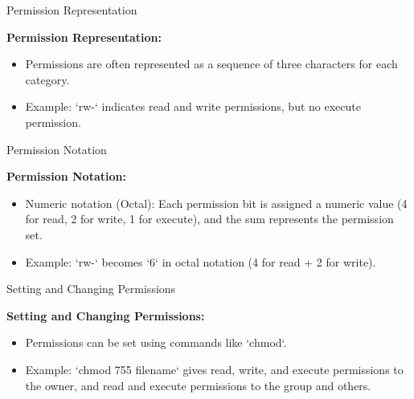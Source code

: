 \documentclass{beamer}
\begin{document}
\begin{frame}{Permission Representation}

  \textbf{Permission Representation:}

  \begin{itemize}
    \item Permissions are often represented as a sequence of three characters for each category.
    \item Example: `rw-` indicates read and write permissions, but no execute permission.
  \end{itemize}

\end{frame}

\begin{frame}{Permission Notation}

  \textbf{Permission Notation:}

  \begin{itemize}
    \item Numeric notation (Octal): Each permission bit is assigned a numeric value (4 for read, 2 for write, 1 for execute), and the sum represents the permission set.
    \item Example: `rw-` becomes `6` in octal notation (4 for read + 2 for write).
  \end{itemize}

\end{frame}

\begin{frame}{Setting and Changing Permissions}

  \textbf{Setting and Changing Permissions:}

  \begin{itemize}
    \item Permissions can be set using commands like `chmod`.
    \item Example: `chmod 755 filename` gives read, write, and execute permissions to the owner, and read and execute permissions to the group and others.
  \end{itemize}

\end{frame}
\end{document}
